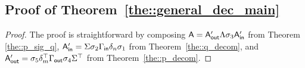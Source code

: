 \subsection{Proof of Theorem~\ref{the::general_dec_main}} 
\label{sec::proof_general}
\iffalse
\begin{theorem}[Restatement of Theorem~\ref{the::general_dec_main}] 
Let an $m\times n$ sparse matrix $\adjmat\in \Mbb_{m,n}(\Rcal)$ contains $\nrow$ non-zero rows, $\ncol$ non-zero columns, and $\numnonzero$ non-zero elements.
Then, there exists a matrix decomposition
$\adjmat= \sigma_5 \delta_m ^{\top} \gammaout \sigma _4 \Sigma ^{\top} \Lambda \sigma _3 \Sigma \sigma_2 \gammain \delta _n \sigma _1$,
where $\sigma _5 \in \Sbb_m$, $\sigma_4 \in \Sbb_{\numnonzero}, \sigma_3 \in \Sbb_{\numnonzero},\sigma _2 \in \Sbb_{\numnonzero},\sigma _1 \in \Sbb_n$, and,\\
1) $\Sigma=(\Sigma[i, j])_{i,j=1}^{\numnonzero}$ is the left-down triangle matrix such that $\Sigma[i, j]=1$ if $i \geq j$ or $0$ otherwise,\\
2) $\delta_k=(\delta_k[i,j])_{i,j=1}^{k}$ is the left-down triangle matrix such that $\delta_k[i,j]=1$ for $i=j$ or $-1$ for $j=i-1$, or $0$ otherwise,\\
3) $\gammain =(\gammain[i,j])_{i=1,j=1}^{\numnonzero,n}$ is a matrix such that $\gammain[i,j]=1$ for $1\leq i=j\leq \ncol$ or $0$ otherwise,\\
4) $\gammaout =(\gammaout[i,j])_{i=1,j=1}^{m,\numnonzero}$ is a matrix such that $\gammaout[i,j]=1$ for $1\leq i=j\leq {\nrow}$ or $0$ otherwise.
\end{theorem}
\fi

\begin{proof}
The proof is straightforward by composing $\mathsf{A} = \mathsf{A}_{\mathsf{out}}' \Lambda \sigma_3 \mathsf{A}_{\mathsf{in}}'$ from Theorem \ref{the::p_sig_q}, $\mathsf{A}_{\mathsf{in}}'=\Sigma \sigma_2 \Gamma_{\mathsf{in}} \delta _n \sigma _1$ from Theorem~\ref{the::q_decom}, and $\mathsf{A}_{\mathsf{out}}'=\sigma_5 \delta_m ^\top \Gamma_{\mathsf{out}} \sigma_4 \Sigma ^\top$ from Theorem~\ref{the::p_decom}.
\end{proof}

